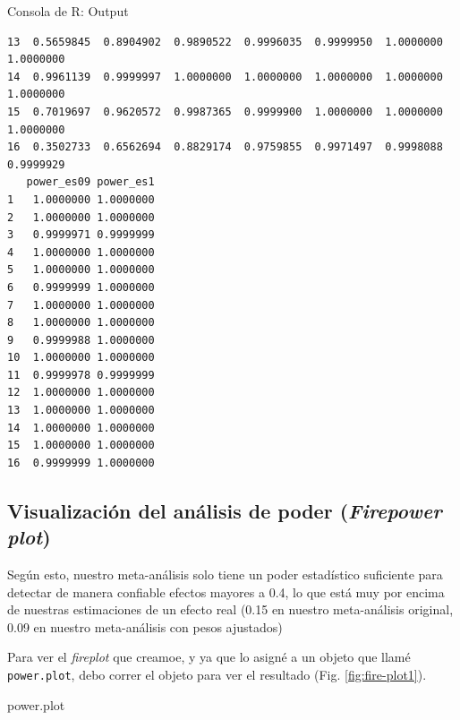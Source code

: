\documentclass[
  bookmarksnumbered]{article}
\newenvironment{Shaded}{\begin{snugshade}}{\end{snugshade}}
\newcommand{\FunctionTok}[1]{\textcolor[rgb]{0.39,0.29,0.61}{#1}}
\newcommand{\NormalTok}[1]{\textcolor[rgb]{0.12,0.11,0.11}{#1}}
\newcommand{\OtherTok}[1]{\textcolor[rgb]{0.00,0.43,0.16}{#1}}
\newcommand{\SpecialCharTok}[1]{\textcolor[rgb]{0.24,0.68,0.91}{#1}}
\begin{document}
\begin{ROut}{Consola de R: Output~\thetcbcounter}
\begin{footnotesize}
\begin{verbatim}
13  0.5659845  0.8904902  0.9890522  0.9996035  0.9999950  1.0000000  1.0000000
14  0.9961139  0.9999997  1.0000000  1.0000000  1.0000000  1.0000000  1.0000000
15  0.7019697  0.9620572  0.9987365  0.9999900  1.0000000  1.0000000  1.0000000
16  0.3502733  0.6562694  0.8829174  0.9759855  0.9971497  0.9998088  0.9999929
   power_es09 power_es1
1   1.0000000 1.0000000
2   1.0000000 1.0000000
3   0.9999971 0.9999999
4   1.0000000 1.0000000
5   1.0000000 1.0000000
6   0.9999999 1.0000000
7   1.0000000 1.0000000
8   1.0000000 1.0000000
9   0.9999988 1.0000000
10  1.0000000 1.0000000
11  0.9999978 0.9999999
12  1.0000000 1.0000000
13  1.0000000 1.0000000
14  1.0000000 1.0000000
15  1.0000000 1.0000000
16  0.9999999 1.0000000
 \end{verbatim}
                \end{footnotesize}
                \end{ROut}

\hypertarget{visualizaciuxf3n-del-anuxe1lisis-de-poder-firepower-plot}{%
\subsection{\texorpdfstring{Visualización del análisis de poder (\emph{Firepower plot})}{Visualización del análisis de poder (Firepower plot)}}\label{visualizaciuxf3n-del-anuxe1lisis-de-poder-firepower-plot}}

Según esto, nuestro meta-análisis solo tiene un poder estadístico suficiente para detectar de manera confiable efectos mayores a 0.4, lo que está muy por encima de nuestras estimaciones de un efecto real (0.15 en nuestro meta-análisis original, 0.09 en nuestro meta-análisis con pesos ajustados)

\begin{Shaded}
\end{Shaded}

Para ver el \emph{fireplot} que creamoe, y ya que lo asigné a un objeto que llamé \texttt{power.plot}, debo correr el objeto para ver el resultado (Fig. \ref{fig:fire-plot1}).

\begin{Shaded}
\begin{Highlighting}[]
\NormalTok{power.plot}
\end{Highlighting}
\end{Shaded}
\end{document}
